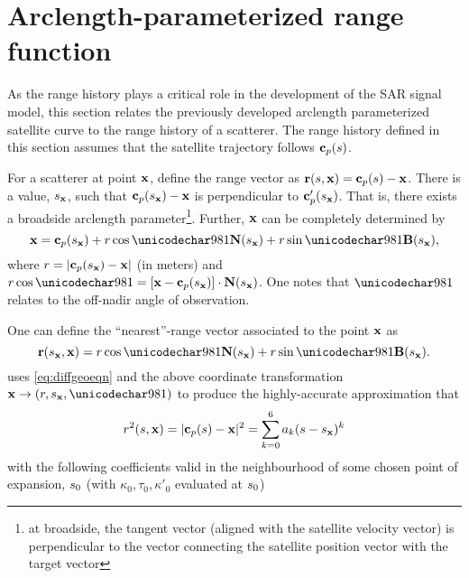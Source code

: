 \section{Arclength-parameterized range function}
\label{sc:rangeHistory}
As the range history plays a critical role in the development of the SAR signal model, this section relates the previously developed arclength parameterized satellite curve to the range history of a scatterer. The range history defined in this section assumes that the satellite trajectory follows $\mathbf{c}_p(s)$. 
\par
For a scatterer at point $\mathbf{\mathbf{x}}$, define the range vector as $\mathbf{r}(s, \mathbf{\mathbf{x}}) = \mathbf{c}_p(s) - \mathbf{\mathbf{x}}$. There is a value, $s_{\mathbf{x}}$, such that $\mathbf{c}_p(s_{\mathbf{x}}) - \mathbf{\mathbf{x}}$ is perpendicular to $\mathbf{c}_p'(s_{\mathbf{x}})$. That is, there exists a broadside arclength parameter\footnote{at broadside, the tangent vector (aligned with the satellite velocity vector) is perpendicular to the vector connecting the satellite position vector with the target vector}. Further, $\mathbf{\mathbf{x}}$ can be completely determined by 
\begin{equation}
 \vct\target = \satp(\targetxparm) + \targetrange\cos\targetdepression\vct{N}(\targetxparm) + \targetrange\sin\targetdepression\vct{B}(\targetxparm),
\end{equation}
where $r=\lvert\mathbf{c}_p(s_{\mathbf{x}})-\mathbf{\mathbf{x}}\rvert$ (in meters) and $\targetrange\cos\targetdepression = [\vct\target - \satp(\targetxparm)]\cdot\vct{N}(\targetxparm)$. One notes that $\targetdepression$ relates to the off-nadir angle of observation. 
\par
One can define the ``nearest''-range vector associated to the point $\mathbf{\mathbf{x}}$ as  
\begin{equation}
\rangeVector{\targetxparm, \vct\target} = \targetrange\cos\targetdepression\vct{N}(\targetxparm) + \targetrange\sin\targetdepression\vct{B}(\targetxparm).
\end{equation}
 uses \eqref{eq:diffgeoeqn} and the above coordinate transformation $\vct\target\rightarrow(\targetrange, \targetxparm, \targetdepression)$ to produce the highly-accurate approximation that 
\begin{equation}
 \targetrange^2(\parm, \vct\target) = \lvert\satp(\parm)-\vct\target\rvert^2 = \sum_{k=0}^6\rcoeff_k(\parm-\targetxparm)^k
 \label{eq:bestRangeEquation}
\end{equation}
with the following coefficients valid in the neighbourhood of some chosen point of expansion, $s_0$ (with $\kappa_0, \tau_0, {\kappa'}_0$ evaluated at $s_0$)
